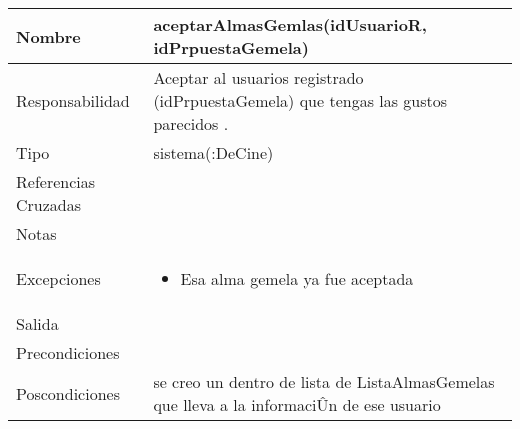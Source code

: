 \documentclass{article}
\begin{document}
\begin{table}[h]
\begin{tabular}{|l|l|l|l|l|l|}
\hline
\multicolumn{2}{|p{3cm}|}{Nombre} & \multicolumn{4}{p{10cm}|}{\textbf{aceptarAlmasGemlas(idUsuarioR, idPrpuestaGemela)}}\\
\hline
\multicolumn{2}{|p{3cm}|}{Responsabilidad} & \multicolumn{4}{p{10cm}|}{Aceptar al usuarios registrado (idPrpuestaGemela) que tengas las gustos parecidos .} \\
\hline
\multicolumn{2}{|p{3cm}|}{Tipo} & \multicolumn{4}{p{10cm}|}{sistema(:DeCine)} \\
\hline
\multicolumn{2}{|p{3cm}|}{Referencias Cruzadas} & \multicolumn{4}{p{10cm}|}{} \\
\hline
\multicolumn{2}{|p{3cm}|}{Notas} & \multicolumn{4}{p{10cm}|}{} \\
\hline
\multicolumn{2}{|p{3cm}|}{Excepciones} & \multicolumn{4}{p{10cm}|}{\begin{itemize}
\item Esa alma gemela ya fue aceptada
\end{itemize}} \\
\hline
\multicolumn{2}{|p{3cm}|}{Salida} & \multicolumn{4}{p{10cm}|}{} \\
\hline
\multicolumn{2}{|p{3cm}|}{Precondiciones} & \multicolumn{4}{p{10cm}|}{} \\
\hline
\multicolumn{2}{|p{3cm}|}{Poscondiciones} & \multicolumn{4}{p{10cm}|}{se creo un  dentro de lista de ListaAlmasGemelas que lleva a la informaciÛn de ese usuario} \\
\hline
\end{tabular}
\end{table}
\end{document}
